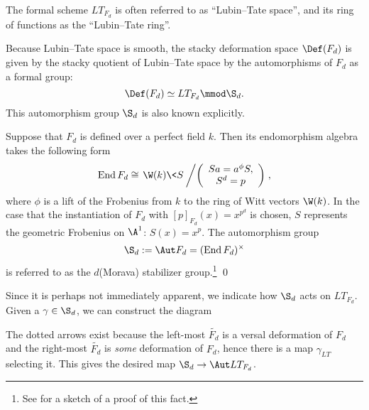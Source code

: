 \begin{definition}
The formal scheme $LT_{F_d}$ is often referred to as ``Lubin--Tate space'', and its ring of functions as the ``Lubin--Tate ring''.
\end{definition}

Because Lubin--Tate space is smooth, the stacky deformation space $\Def(F_d)$ is given by the stacky quotient of Lubin--Tate space by the automorphisms of $F_d$ as a formal group: \[\Def(F_d) \simeq LT_{F_d} \mmod \S_d.\]  This automorphism group $\S_d$ is also known explicitly.

\begin{theorem}\label{DefnStabilizerAlgebra}
Suppose that $F_d$ is defined over a perfect field $k$.  Then its endomorphism algebra takes the following form \[\operatorname{End} F_d \cong \left.\W(k)\<S\> \middle/\left( \begin{array}{c} Sa = a^\phi S, \\ S^d = p \end{array}\right) \right.,\] where $\phi$ is a lift of the Frobenius from $k$ to the ring of Witt vectors $\W(k)$.  In the case that the instantiation of $F_d$ with $[p]_{F_d}(x) = x^{p^d}$ is chosen, $S$ represents the geometric Frobenius on $\A^1$: $S(x) = x^p$.  The automorphism group \[\S_d := \Aut F_d = (\operatorname{End} F_d)^\times\] is referred to as the $d$\th (Morava) stabilizer group.\footnote{See  for a sketch of a proof of this fact.} \qed
\end{theorem}

\begin{remark}
Since it is perhaps not immediately apparent, we indicate how $\S_d$ acts on $LT_{F_d}$.  Given a $\gamma \in \S_d$, we can construct the diagram
\begin{center}
\end{center}
The dotted arrows exist because the left-most $\widetilde{F_d}$ is a versal deformation of $F_d$ and the right-most $\widetilde{F_d}$ is \emph{some} deformation of $F_d$, hence there is a map $\gamma_{LT}$ selecting it.  This gives the desired map $\S_d \to \Aut LT_{F_d}$.
\end{remark}

